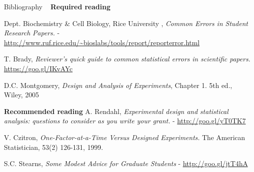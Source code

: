\documentclass[t]{beamer}
\begin{document}
\begin{ftst}
{Bibliography}
{\ }
\scriptsize
\textbf{Required reading}

\benums Dept. Biochemistry \& Cell Biology, Rice University , \textit{Common Errors in Student Research Papers.} - {\tiny\url{http://www.ruf.rice.edu/~bioslabs/tools/report/reporterror.html}}
\item T. Brady, \textit{Reviewer's quick guide to common statistical errors in scientific papers.}\\
{\tiny\url{https://goo.gl/IKvAYc}}
\item D.C. Montgomery, \textit{Design and Analysis of Experiments}, Chapter 1. 5th ed., Wiley, 2005
\eenum

\textbf{Recommended reading}
\benums A. Rendahl, \textit{Experimental design and statistical analysis: questions to consider as you write your grant.} - {\tiny\url{http://goo.gl/yT0TK7}}
\item V. Czitron, \textit{One-Factor-at-a-Time Versus Designed Experiments.} The American Statistician, 53(2) 126-131, 1999.
\item S.C. Stearns, \textit{Some Modest Advice for Graduate Students} - {\tiny\url{http://goo.gl/jtT4hA}}

\eenum
\end{ftst}



\end{document}
